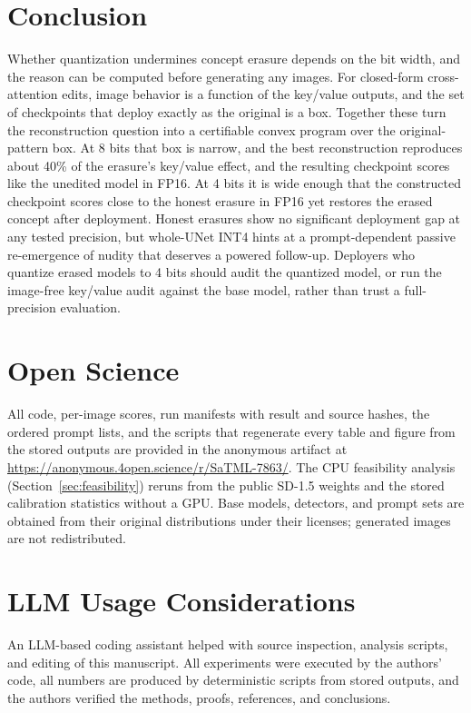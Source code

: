 \section{Conclusion}
Whether quantization undermines concept erasure depends on the bit width, and the
reason can be computed before generating any images. For closed-form cross-attention
edits, image behavior is a function of the key/value outputs, and the set of
checkpoints that deploy exactly as the original is a box. Together these turn the
reconstruction question into a certifiable convex program over the original-pattern
box. At 8 bits that box is narrow, and the best reconstruction reproduces about 40\% of the
erasure's key/value effect, and the resulting checkpoint scores like the unedited model
in FP16. At 4 bits it is wide enough that the constructed checkpoint scores close to
the honest erasure in FP16 yet restores the erased concept after deployment. Honest erasures show no significant deployment gap at any tested
precision, but whole-UNet INT4 hints at a prompt-dependent passive re-emergence of
nudity that deserves a powered follow-up. Deployers who quantize
erased models to 4 bits should audit the quantized model, or run the image-free
key/value audit against the base model, rather than trust a full-precision
evaluation.

\section*{Open Science}
All code, per-image scores, run manifests with result and source hashes, the ordered
prompt lists, and the scripts that regenerate every table and figure from the stored
outputs are provided in the anonymous artifact at \url{https://anonymous.4open.science/r/SaTML-7863/}. The CPU
feasibility analysis (Section~\ref{sec:feasibility}) reruns from the public SD-1.5
weights and the stored calibration statistics without a GPU. Base models, detectors,
and prompt sets are obtained from their original distributions under their licenses;
generated images are not redistributed.

\section*{LLM Usage Considerations}
An LLM-based coding assistant helped with source inspection, analysis scripts, and
editing of this manuscript. All experiments were executed by the authors'
code, all numbers are produced by deterministic scripts from stored outputs, and the
authors verified the methods, proofs, references, and conclusions.

